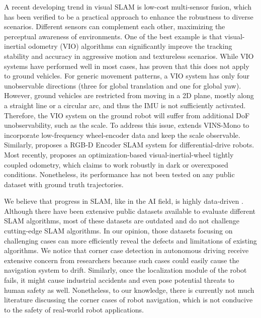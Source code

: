 \documentclass[conference]{IEEEtran}
\begin{document}
A recent developing trend in visual SLAM is low-cost multi-sensor fusion, which has been verified to be a practical approach \cite{yin2021m2dgr}
to enhance the robustness to diverse scenarios. Different sensors can complement each other, maximizing the perceptual awareness of environments. One of the best example is that visual-inertial odometry (VIO) algorithms can significantly improve the tracking stability and accuracy in aggressive motion and textureless scenarios. 
While VIO systems have performed well in most cases, \cite{hesch2013consistency} has proven that this does not apply to ground vehicles.
For generic movement patterns, a VIO system has only four unobservable directions (three for global translation and one for global yaw). However, ground vehicles are restricted from moving in a 2D plane, mostly along a straight line or a circular arc, and thus the IMU is not sufficiently activated. 
Therefore, the VIO system on the ground robot will suffer from additional DoF unobservability, such as the scale. To address this issue, \cite{wu2017vins} extends VINS-Mono \cite{qin2018vins} to
incorporate low-frequency wheel-encoder data and keep the scale observable. Similarly, \cite{yang2019dre} proposes a RGB-D Encoder SLAM system for differential-drive robots. Most recently, \cite{Tingda2022VIW} proposes an optimization-based visual-inertial-wheel tightly coupled odometry, which claims to work robustly in dark or overexposed conditions. Nonetheless, its performance has not been tested on any public dataset with ground truth trajectories.


We believe that progress in SLAM, like in the AI field, is highly data-driven \cite{deng2009imagenet}. 
Although there have been extensive public datasets available to evaluate different SLAM algorithms, most of these datasets are outdated and do not challenge cutting-edge SLAM algorithms. In our opinion, those datasets focusing on challenging cases can more efficiently reveal the defects and limitations of existing algorithms. We notice that corner case detection in autonomous driving receive extensive concern from researchers \cite{bolte2019towards} \cite{muhammad2020deep} because such cases could easily cause the navigation system to drift. Similarly, once the localization module of the robot fails, it might cause industrial accidents and even pose potential threats to human safety as well. Nonetheless, to our knowledge, there is currently not much literature discussing the corner cases of robot navigation, which is not conducive to the safety of real-world robot applications.
\end{document}
